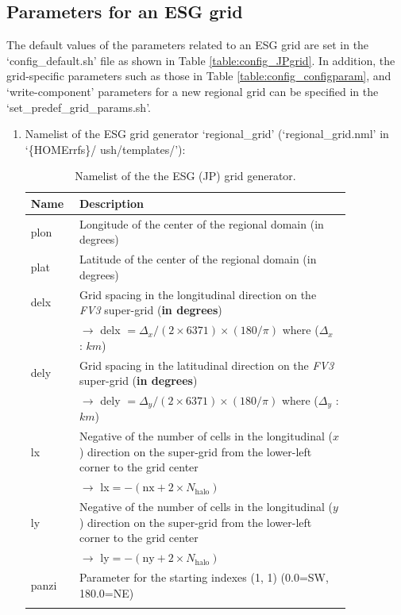 \documentclass[11pt,fleqn]{report}              %
\begin{document}
\subsection{Parameters for an ESG grid}
\label{subsec:new_predef_grid_esg}

The default values of the parameters related to an ESG grid are set in the `config\_default.sh' file as shown in Table \ref{table:config_JPgrid}. In addition, the grid-specific parameters such as those in Table \ref{table:config_configparam}, and `write-component' parameters for a new regional grid can be specified in the `set\_predef\_grid\_params.sh'.

\begin{enumerate}
\item Namelist of the ESG grid generator `regional\_grid' (`regional\_grid.nml' in `\{HOMErrfs\}/ ush/templates/'):

{
\fontsize{10}{12}\selectfont
\begin{longtable}{ p{0.1\linewidth} | p{0.74\linewidth} }
\hline
\hline
Name & Description \\
\hline
 plon & Longitude of the center of the regional domain (in degrees) \\
 plat & Latitude of the center of the regional domain (in degrees) \\
 delx & Grid spacing in the longitudinal direction on the {\it FV3} super-grid ({\bf in degrees}) \\
 & $\rightarrow$ delx $=\Delta_x / (2\times 6371)\times(180/\pi)$ where ($\Delta_x$ : $km$)  \\
 dely & Grid spacing in the latitudinal direction on the {\it FV3} super-grid ({\bf in degrees}) \\
 & $\rightarrow$ dely $=\Delta_y / (2\times 6371)\times(180/\pi)$ where ($\Delta_y$ : $km$)  \\
 lx & Negative of the number of cells in the longitudinal ($x$) direction on the super-grid from the lower-left corner to the grid center \\
& $\rightarrow$ lx$=-(\text{nx} + 2\times N_{\text{halo}})$ \\
 ly & Negative of the number of cells in the longitudinal ($y$) direction on the super-grid from the lower-left corner to the grid center \\
& $\rightarrow$ ly$=-(\text{ny} + 2\times N_{\text{halo}})$ \\
 panzi & Parameter for the starting indexes (1, 1) (0.0=SW, 180.0=NE) \\
\hline
\caption{Namelist of the the ESG (JP) grid generator.}
\label{table:namelist_esg_grid}
\end{longtable}
}


\end{enumerate}
\end{document}

